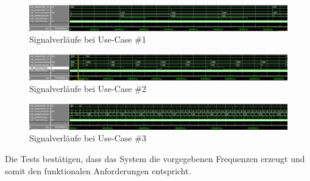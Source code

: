 \begin{figure}[h!]
    \centering
    \includegraphics[width=\linewidth]{img/simulation_algo_uc1.png}
    \caption{Signalverläufe bei Use-Case \#1}
    \label{img:sim_algo_uc1}
\end{figure}
\begin{figure}[h!]
    \centering
    \includegraphics[width=\linewidth]{img/simulation_algo_uc2.png}
    \caption{Signalverläufe bei Use-Case \#2}
    \label{img:sim_algo_uc2}
\end{figure}
\begin{figure}[h!]
    \centering
    \includegraphics[width=\linewidth]{img/simulation_algo_uc3_1.png}
    \caption{Signalverläufe bei Use-Case \#3}
    \label{img:sim_algo_uc3}
\end{figure}

\noindent Die Tests bestätigen, dass das System die vorgegebenen Frequenzen erzeugt und somit den funktionalen Anforderungen entspricht.
